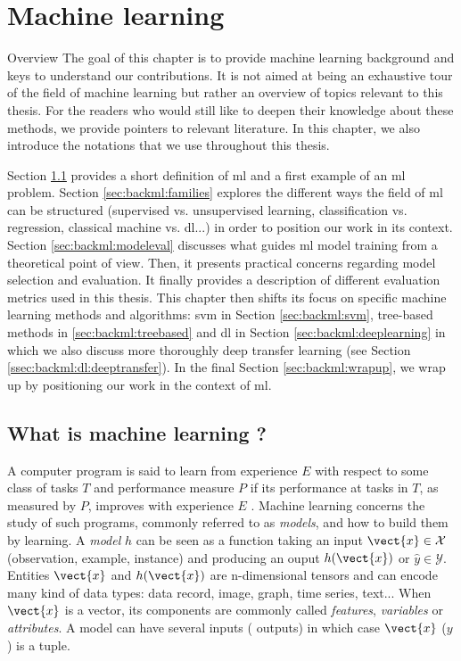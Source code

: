 \chapter{Machine learning}
\label{chap:backml}

\begin{overview}{Overview}
The goal of this chapter is to provide machine learning background and keys to understand our contributions. It is not aimed at being an exhaustive tour of the field of machine learning but rather an overview of topics relevant to this thesis. For the readers who would still like to deepen their knowledge about these methods, we provide pointers to relevant literature. In this chapter, we also introduce the notations that we use throughout this thesis.

Section \ref{sec:backml:whatisml} provides a short definition of \acrlong{ml} and a first example of an \acrshort{ml} problem. Section \ref{sec:backml:families} explores the different ways the field of \acrlong{ml} can be structured (\eg supervised vs. unsupervised learning, classification vs. regression, classical machine vs. \acrlong{dl}...) in order to position our work in its context. Section \ref{sec:backml:modeleval} discusses what guides \acrlong{ml} model training from a theoretical point of view. Then, it presents practical concerns regarding model selection and evaluation. It finally provides a description of different evaluation metrics used in this thesis. This chapter then shifts its focus on specific machine learning methods and algorithms: \acrlong{svm} in Section \ref{sec:backml:svm}, tree-based methods in \ref{sec:backml:treebased} and \acrlong{dl} in Section \ref{sec:backml:deeplearning} in which we also discuss more thoroughly deep transfer learning (see Section \ref{ssec:backml:dl:deeptransfer}). In the final Section \ref{sec:backml:wrapup}, we wrap up by positioning our work in the context of \acrlong{ml}.
\end{overview}

\section{What is machine learning ?}
\label{sec:backml:whatisml}

A computer program is said to learn from experience $E$ with respect to some class
of tasks $T$ and performance measure $P$ if its performance at tasks in $T$, as
measured by $P$, improves with experience $E$ \cite{mitchell1997machine}.
Machine learning concerns the study of such programs, commonly referred to as
\textit{models}, and how to build them by learning. A \textit{model} $h$ can be
seen as a function taking an input $\vect{x} \in \mathcal{X}$ (\aka observation,
example, instance) and producing an ouput $h(\vect{x})$ or $\hat{y} \in \mathcal{Y}$.
Entities $\vect{x}$ and $h(\vect{x})$ are n-dimensional tensors and can encode
many kind of data types: data record, image, graph, time series, text... When
$\vect{x}$ is a vector, its components are commonly called \textit{features},
\textit{variables} or \textit{attributes}. A model can have several inputs (\resp
outputs) in which case $\vect{x}$ (\resp $y$) is a tuple. 

